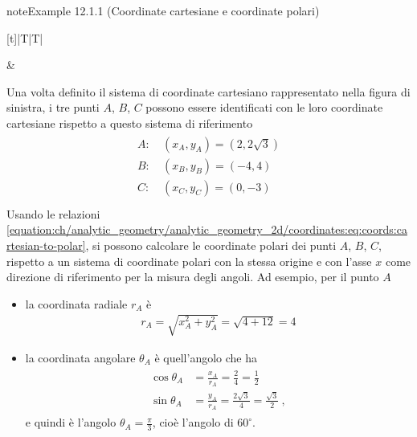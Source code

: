 \documentclass[letterpaper,10pt,italian]{jupyterBook}
\begin{document}
\begin{sphinxadmonition}{note}{Example 12.1.1 (Coordinate cartesiane e coordinate polari)}




\begin{savenotes}\sphinxattablestart
\centering
\begin{tabulary}{\linewidth}[t]{|T|T|}
\hline

\sphinxAtStartPar
{}
&
\sphinxAtStartPar
{}
\\
\hline
\end{tabulary}
\par
\sphinxattableend\end{savenotes}

\sphinxAtStartPar
Una volta definito il sistema di coordinate cartesiano rappresentato nella figura di sinistra, i tre punti \(A\), \(B\), \(C\) possono essere identificati con le loro coordinate cartesiane rispetto a questo sistema di riferimento
\begin{equation*}
\begin{split}\begin{aligned}
A: \ & (x_A, y_A) = (2, 2\sqrt{3}) \\
B: \ & (x_B, y_B) = (-4, 4) \\
C: \ & (x_C, y_C) = (0, -3) \\
\end{aligned}\end{split}
\end{equation*}
\sphinxAtStartPar
Usando le relazioni \eqref{equation:ch/analytic_geometry/analytic_geometry_2d/coordinates:eq:coords:cartesian-to-polar}, si possono calcolare le coordinate polari dei punti \(A\), \(B\), \(C\), rispetto a un sistema di coordinate polari con la stessa origine e con l’asse \(x\) come direzione di riferimento per la misura degli angoli. Ad esempio, per il punto \(A\)
\begin{itemize}
\item {} 
\sphinxAtStartPar
la coordinata radiale \(r_A\) è
\begin{equation*}
\begin{split}r_A = \sqrt{x_A^2 + y_A^2} = \sqrt{ 4 + 12 } = 4\end{split}
\end{equation*}
\item {} 
\sphinxAtStartPar
la coordinata angolare \(\theta_A\) è quell’angolo che ha
\begin{equation*}
\begin{split}\begin{aligned}
      \cos \theta_A & = \frac{x_A}{r_A} = \frac{2}{4} = \frac{1}{2} \\
      \sin \theta_A & = \frac{y_A}{r_A} = \frac{2 \sqrt{3}}{4} = \frac{\sqrt{3}}{2} \ ,
   \end{aligned}\end{split}
\end{equation*}
\sphinxAtStartPar
e quindi è l’angolo  \(\theta_A = \frac{\pi}{3}\), cioè l’angolo di \(60^\circ\).

\end{itemize}
\end{sphinxadmonition}
\end{document}
